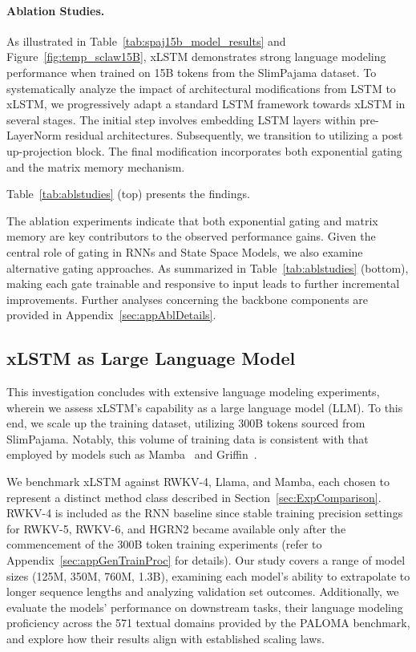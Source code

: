 \paragraph{Ablation Studies.}
As illustrated in Table~\ref{tab:spaj15b_model_results} and Figure~\ref{fig:temp_sclaw15B}, xLSTM demonstrates strong language modeling performance when trained on 15B tokens from the SlimPajama dataset. To systematically analyze the impact of architectural modifications from LSTM to xLSTM, we progressively adapt a standard LSTM framework towards xLSTM in several stages. The initial step involves embedding LSTM layers within pre-LayerNorm residual architectures. Subsequently, we transition to utilizing a post up-projection block. The final modification incorporates both exponential gating and the matrix memory mechanism.

Table~\ref{tab:ablstudies} (top) presents the findings.

The ablation experiments indicate that both exponential gating and matrix memory are key contributors to the observed performance gains. Given the central role of gating in RNNs and State Space Models, we also examine alternative gating approaches. As summarized in Table~\ref{tab:ablstudies} (bottom), making each gate trainable and responsive to input leads to further incremental improvements. Further analyses concerning the backbone components are provided in Appendix~\ref{sec:appAblDetails}.

\subsection{xLSTM as Large Language Model}
\label{sec:ExpLanguage}

This investigation concludes with extensive language modeling experiments, wherein we assess xLSTM’s capability as a large language model (LLM). To this end, we scale up the training dataset, utilizing 300B tokens sourced from SlimPajama. Notably, this volume of training data is consistent with that employed by models such as Mamba~\citep{Gu:24arxiv} and Griffin~\citep{De:24arxiv}.

We benchmark xLSTM against RWKV-4, Llama, and Mamba, each chosen to represent a distinct method class described in Section~\ref{sec:ExpComparison}. RWKV-4 is included as the RNN baseline since stable training precision settings for RWKV-5, RWKV-6, and HGRN2 became available only after the commencement of the 300B token training experiments (refer to Appendix~\ref{sec:appGenTrainProc} for details). Our study covers a range of model sizes (125M, 350M, 760M, 1.3B), examining each model’s ability to extrapolate to longer sequence lengths and analyzing validation set outcomes. Additionally, we evaluate the models' performance on downstream tasks, their language modeling proficiency across the 571 textual domains provided by the PALOMA benchmark, and explore how their results align with established scaling laws.

